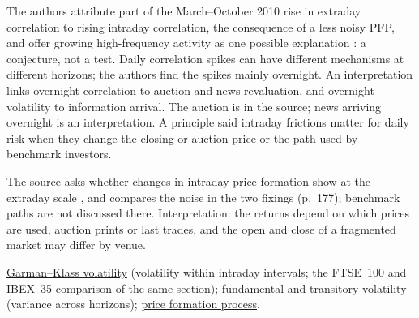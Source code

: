 \begin{qfdefinition}
 The authors attribute part of the March--October 2010 rise in extraday correlation to rising intraday correlation, the consequence of a less noisy PFP, and offer growing high-frequency activity as one possible explanation \citep[same sec., p.~177]{alpha-laruelle}: a conjecture, not a test. Daily correlation spikes can have different mechanisms at different horizons; the authors find the spikes mainly overnight. An interpretation links overnight correlation to auction and news revaluation, and overnight volatility to information arrival. The auction is in the source; news arriving overnight is an interpretation. A principle said intraday frictions matter for daily risk when they change the closing or auction price or the path used by benchmark investors.

The source asks whether changes in intraday price formation show at the extraday scale \citep[same chap., sec.~2.5, p.~169]{alpha-laruelle}, and compares the noise in the two fixings (p.~177); benchmark paths are not discussed there. Interpretation: the returns depend on which prices are used, auction prints or last trades, and the open and close of a fragmented market may differ by venue.

 \hyperref[meth:garman-klass-volatility]{Garman--Klass volatility} (volatility within intraday intervals; the FTSE~100 and IBEX~35 comparison of the same section); \hyperref[def:volatility-components]{fundamental and transitory volatility} (variance across horizons); \hyperref[def:price-formation-process]{price formation process}.

\end{qfdefinition}

